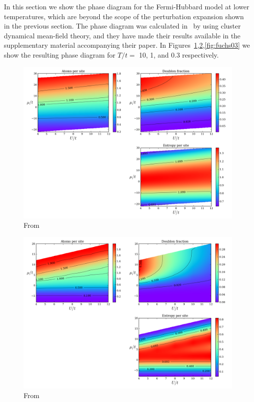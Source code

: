 \documentclass[oneside,11pt]{memoir}
\begin{document}
In this section we show the phase diagram for the Fermi-Hubbard model at lower
temperatures, which are beyond the scope of the perturbation expansion shown in
the previous section.   The phase diagram was calculated in~\cite{Fuchs2011} by
using cluster dynamical mean-field theory, and they have made their results
available in the supplementary material accompanying their paper.  In
Figures~\ref{fig:fuchs10},\ref{fig:fuchs01},\ref{fig:fuchs03} we show the
resulting phase diagram for $T/t=$ 10, 1, and 0.3 respectively.

\begin{figure}
\centering \includegraphics[width=\textwidth]{../figures/HubbardPhaseDiagram_figures/FUCHS_phasesT=100.png}
\caption[Low temperature phase diagram of the Fermi-Hubbard model]{\small
From~\cite{Fuchs2011}} \label{fig:fuchs10}
\end{figure}

\begin{figure}
\centering \includegraphics[width=\textwidth]{../figures/HubbardPhaseDiagram_figures/FUCHS_phasesT=10.png}
\caption[Low temperature phase diagram of the Fermi-Hubbard model]{\small
From~\cite{Fuchs2011}} \label{fig:fuchs01}
\end{figure}
   
\end{document}
